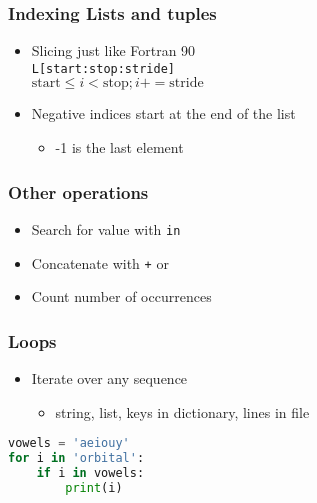 \documentclass[xcolor=table,10pt,final]{beamer}
\begin{document}
\begin{frame}[fragile]
  \frametitle{Indexing Lists and tuples}
  \begin{itemize}
    \item Slicing just like Fortran 90\\
      \lstinline[language=Python]|L[start:stop:stride]|\\
      $\mathrm{start} \leq i < \mathrm{stop}; i+=\mathrm{stride}$
    \item Negative indices start at the end of the list
      \begin{itemize}
        \item -1 is the last element
      \end{itemize}
  \end{itemize}
\end{frame}

\begin{frame}[fragile]
  \frametitle{Other operations}
  \begin{itemize}
    \item Search for value with {\tt in}
    \item Concatenate with {\tt +} or {\tt *}
    \item Count number of occurrences
  \end{itemize}
\end{frame}

\begin{frame}[fragile]
  \frametitle{Loops}
  \begin{itemize}
    \item Iterate over any sequence
      \begin{itemize}
        \item string, list, keys in dictionary, lines in file
      \end{itemize}
  \end{itemize}
  \begin{lstlisting}[language=Python]
vowels = 'aeiouy'
for i in 'orbital':
    if i in vowels:
        print(i)
\end{lstlisting}
\end{frame}
\end{document}
